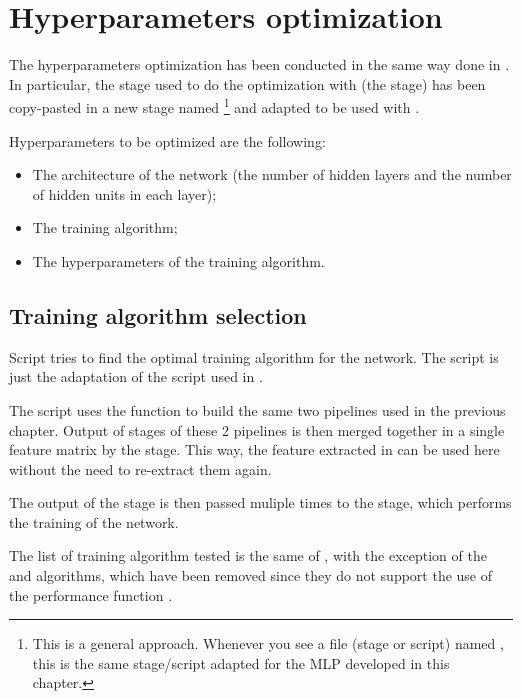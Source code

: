 \section{Hyperparameters optimization}\label{sec:activityhyperopt}

The hyperparameters optimization has been conducted in the same way done in
. In particular, the stage used to do the optimization
with  (the  stage) has been copy-pasted in
a new stage named \footnote{This is a general approach.
Whenever you see a file (stage or script) named , this
is the same  stage/script adapted for the MLP developed in
this chapter.} and adapted to be used with .

Hyperparameters to be optimized are the following:
\begin{itemize}
\item The architecture of the network (the number of hidden layers and the
	number of hidden units in each layer);
\item The training algorithm;
\item The hyperparameters of the training algorithm.
\end{itemize}

\subsection{Training algorithm selection}\label{subsec:activityhyperopt}

Script  tries to find the optimal training algorithm
for the network. The script is just the adaptation of the script used in
.

The script uses the  function to build the same two
pipelines used in the previous chapter. Output of 
stages of these 2 pipelines is then merged together in a single feature matrix
by the  stage. This way, the feature extracted in
 can be used here without the need to re-extract them again.

The output of the  stage is then passed muliple times
to the  stage, which performs the training of the network.

The list of training algorithm tested is the same of
, with the exception of the  and
 algorithms, which have been removed since they do not support
the use of the performance function .

